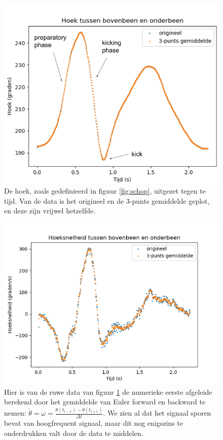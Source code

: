 \documentclass{article}
\begin{document}
\begin{figure}[h]
    \centering
    \includegraphics[width=\textwidth]{figures/Figure_1.png}
    \caption{De hoek, zoals gedefinieerd in figuur \ref{fig:schop}, uitgezet tegen te tijd. Van de data is het origineel en de 3-punts gemiddelde geplot, en deze zijn vrijwel hetzelfde.}
    \label{fig:hoek}
\end{figure}

\begin{figure}[h]
    \centering
    \includegraphics[width=\textwidth]{figures/Figure_2.png}
    \caption{Hier is van de ruwe data van figuur \ref{fig:hoek} de numerieke eerste afgeleide berekend door het gemiddelde van Euler forward en backward te nemen: $\dot{\theta}=\omega=\frac{\theta(t_{i-1}) - \theta(t_{i+1})}{\Delta t}$. We zien al dat het signaal sporen bevat van hoogfrequent signaal, maar dit nog enigszins te onderdrukken valt door de data te middelen.}
    \label{fig:hoeksnelheid}
\end{figure}
\end{document}
